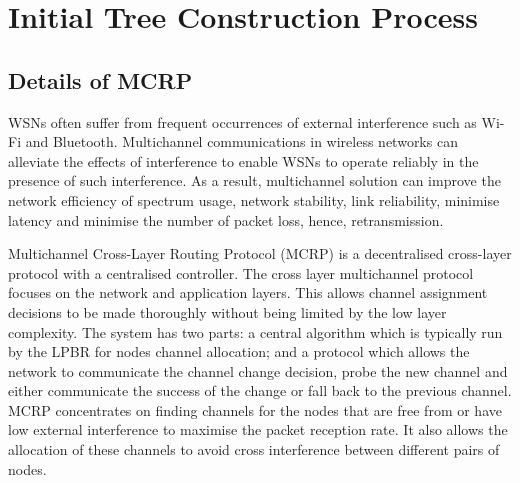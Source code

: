 \section{Initial Tree Construction Process}
\label{MCRP}
\subsection{Details of MCRP}

WSNs often suffer from frequent occurrences of external interference such as Wi-Fi and Bluetooth.
Multichannel communications in wireless networks can alleviate the effects of interference to enable WSNs to operate reliably in the presence of such interference. As a result, multichannel solution can improve the network efficiency of spectrum usage, network stability, link reliability, minimise latency and minimise the number of packet loss, hence, retransmission.

Multichannel Cross-Layer Routing Protocol (MCRP) \cite{mcrp} is a decentralised cross-layer protocol with a centralised controller. The cross layer multichannel protocol focuses on the network and application layers. This allows channel assignment decisions to be made thoroughly without being limited by the low layer complexity. The system has two parts: a central algorithm which is typically run by the LPBR for nodes channel allocation; and a protocol which allows the network to communicate the channel change decision, probe the new channel and either communicate the success of the change or fall back to the previous channel. MCRP concentrates on finding channels for the nodes that are free from or have low external interference to maximise the packet reception rate. It also allows the allocation of these channels to avoid cross interference between different pairs of nodes.




